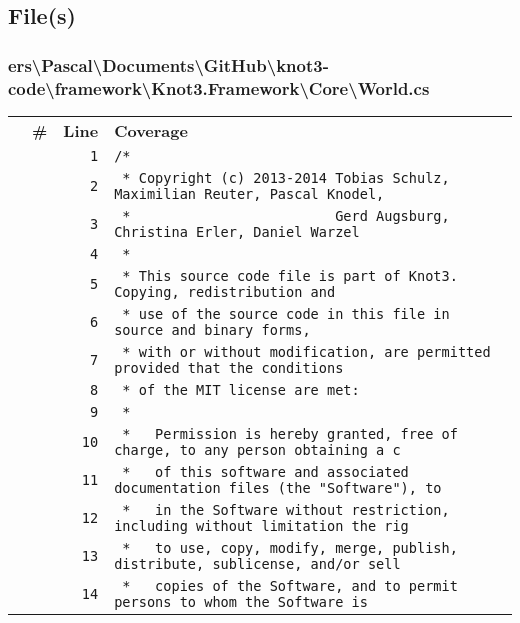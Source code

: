\documentclass[a4paper,10pt]{article}
\begin{document}
\subsection{File(s)}
\subsubsection{ers\textbackslash Pascal\textbackslash Documents\textbackslash GitHub\textbackslash knot3-code\textbackslash framework\textbackslash Knot3.Framework\textbackslash Core\textbackslash World.cs}
\begin{longtable}[l]{lrrl}
\textbf{} & \textbf{\#} & \textbf{Line} & \textbf{Coverage}\\
\cellcolor{gray} &  & \verb~1~ & \verb~/*~\\
\cellcolor{gray} &  & \verb~2~ & \verb~ * Copyright (c) 2013-2014 Tobias Schulz, Maximilian Reuter, Pascal Knodel,~\\
\cellcolor{gray} &  & \verb~3~ & \verb~ *                         Gerd Augsburg, Christina Erler, Daniel Warzel~\\
\cellcolor{gray} &  & \verb~4~ & \verb~ *~\\
\cellcolor{gray} &  & \verb~5~ & \verb~ * This source code file is part of Knot3. Copying, redistribution and~\\
\cellcolor{gray} &  & \verb~6~ & \verb~ * use of the source code in this file in source and binary forms,~\\
\cellcolor{gray} &  & \verb~7~ & \verb~ * with or without modification, are permitted provided that the conditions~\\
\cellcolor{gray} &  & \verb~8~ & \verb~ * of the MIT license are met:~\\
\cellcolor{gray} &  & \verb~9~ & \verb~ *~\\
\cellcolor{gray} &  & \verb~10~ & \verb~ *   Permission is hereby granted, free of charge, to any person obtaining a c~\\
\cellcolor{gray} &  & \verb~11~ & \verb~ *   of this software and associated documentation files (the "Software"), to ~\\
\cellcolor{gray} &  & \verb~12~ & \verb~ *   in the Software without restriction, including without limitation the rig~\\
\cellcolor{gray} &  & \verb~13~ & \verb~ *   to use, copy, modify, merge, publish, distribute, sublicense, and/or sell~\\
\cellcolor{gray} &  & \verb~14~ & \verb~ *   copies of the Software, and to permit persons to whom the Software is~\\

\end{longtable}
\end{document}
